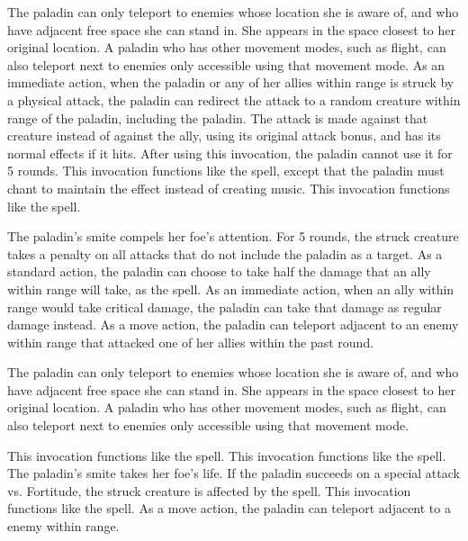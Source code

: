 The paladin can only teleport to enemies whose location she is aware of, and who have adjacent free space she can stand in.
She appears in the space closest to her original location.
A paladin who has other movement modes, such as flight, can also teleport next to enemies only accessible using that movement mode.
As an immediate action, when the paladin or any of her allies within \rngclose range is struck by a physical attack, the paladin can redirect the attack to a random creature within \rngclose range of the paladin, including the paladin.
The attack is made against that creature instead of against the ally, using its original attack bonus, and has its normal effects if it hits.
After using this invocation, the paladin cannot use it for 5 rounds.
 This invocation functions like the 
spell, except that the paladin must chant to maintain the effect instead of creating music.
 This invocation functions like the 
spell.

The paladin's smite compels her foe's attention.
For 5 rounds, the struck creature takes a  penalty on all attacks that do not include the paladin as a target.
 As a standard action, the paladin can choose to take half the damage that an ally within \rngmed range will take, as the 
spell.
As an immediate action, when an ally within \rngmed range would take critical damage, the paladin can take that damage as regular damage instead.
As a move action, the paladin can teleport adjacent to an enemy within \rngmed range that attacked one of her allies within the past round.

The paladin can only teleport to enemies whose location she is aware of, and who have adjacent free space she can stand in.
She appears in the space closest to her original location.
A paladin who has other movement modes, such as flight, can also teleport next to enemies only accessible using that movement mode.

 This invocation functions like the 
spell.
 This invocation functions like the 
spell.
The paladin's smite takes her foe's life.
If the paladin succeeds on a special attack vs. Fortitude, the struck creature is affected by the  spell.
 This invocation functions like the 
spell.
As a move action, the paladin can teleport adjacent to a \bloodied enemy within \rngmed range.

